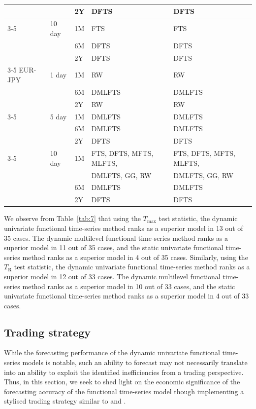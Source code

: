 \documentclass[12pt,a4paper]{article}
\begin{document}
\begin{center}
\begin{longtable}{@{}lllll@{}}
		&		& 2Y & DFTS &	 DFTS	\\
		\cmidrule{3-5}
		& 10 day 	& 1M & FTS & FTS		\\
		&		& 6M & DFTS & DFTS		\\
		&		& 2Y & DFTS &	 DFTS	\\
				\cmidrule{3-5}
EUR-JPY & 1 day	& 1M & RW & RW	\\
		&		& 6M & DMLFTS & DMLFTS		\\
		& 		& 2Y & RW &	 RW	\\
				\cmidrule{3-5}
		& 5 day	& 1M & DMLFTS & DMLFTS		\\
		&		& 6M & DMLFTS & DMLFTS		\\
		&		& 2Y & DFTS & DFTS		\\
				\cmidrule{3-5}
		& 10 day	& 1M & FTS, DFTS, MFTS, MLFTS,  & FTS, DFTS, MFTS, MLFTS, 		\\
		&		& 	& DMLFTS, GG, RW & DMLFTS, GG, RW \\
		&		& 6M & DMLFTS & DMLFTS		\\
		&		& 2Y & DFTS &	 DFTS	\\
		\bottomrule
\end{longtable}
\end{center}

We observe from Table~\ref{tab:7} that using the $T_{\max}$ test statistic, the dynamic univariate functional time-series method ranks as a superior model in 13 out of 35 cases. The dynamic multilevel functional time-series method ranks as a superior model in 11 out of 35 cases, and the static univariate functional time-series method ranks as a superior model in 4 out of 35 cases. Similarly, using the $T_{\text{R}}$ test statistic, the dynamic univariate functional time-series method ranks as a superior model in 12 out of 33 cases. The dynamic multilevel functional time-series method ranks as a superior model in 10 out of 33 cases, and the static univariate functional time-series method ranks as a superior model in 4 out of 33 cases.

\subsection{Trading strategy}\label{sec:trading}

While the forecasting performance of the dynamic univariate functional time-series models is notable, such an ability to forecast may not necessarily translate into an ability to exploit the identified inefficiencies from a trading perspective. Thus, in this section, we seek to shed light on the economic significance of the forecasting accuracy of the functional time-series model though implementing a stylised trading strategy similar to \cite{BG14} and \cite{KCM18}.
\end{document}
